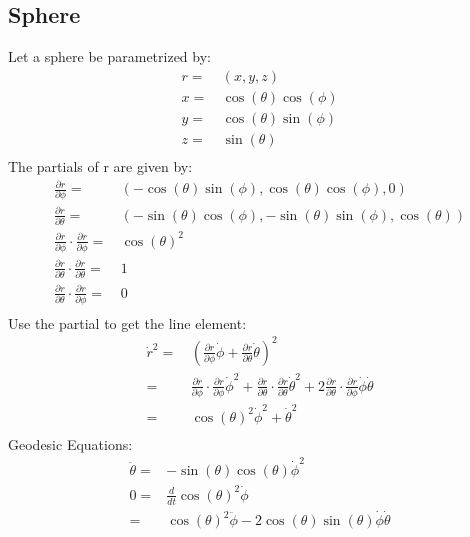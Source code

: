 \subsection{Sphere}
Let a sphere be parametrized by:
\begin{equation*}
\begin{aligned}
	r =&\,(x,y,z) \\
	x =&\, \cos(\theta)\cos(\phi)\\
	y =&\, \cos(\theta)\sin(\phi)\\
	z =&\, \sin(\theta) \\
\end{aligned}
\end{equation*}
The partials of r are given by:
\begin{equation*}
\begin{aligned}
	\frac{\partial r}{\partial \phi} =&\,(-\cos(\theta)\sin(\phi),\cos(\theta)\cos(\phi),0)\\
	\frac{\partial r}{\partial \theta} =&\, (-\sin(\theta)\cos(\phi),-\sin(\theta)\sin(\phi),\cos(\theta)) \\
	\frac{\partial r}{\partial \phi}\cdot\frac{\partial r}{\partial \phi} =&\, \cos(\theta)^2 \\
	\frac{\partial r}{\partial \theta}\cdot\frac{\partial r}{\partial \theta} =&\, 1 \\
	\frac{\partial r}{\partial \theta}\cdot\frac{\partial r}{\partial \phi} =&\, 0 \\
\end{aligned}
\end{equation*}
Use the partial to get the line element:
\begin{equation*}
\begin{aligned}
	\dot{r}^2 =&\, \left(\frac{\partial r}{\partial \phi}\dot{\phi} + \frac{\partial r}{\partial \theta}\dot{\theta}\right)^2 \\
	=&\, \frac{\partial r}{\partial \phi}\cdot\frac{\partial r}{\partial \phi}\dot{\phi}^2+ \frac{\partial r}{\partial \theta}\cdot\frac{\partial r}{\partial \theta}\dot{\theta}^2+2\frac{\partial r}{\partial \theta}\cdot\frac{\partial r}{\partial \phi} \dot{\phi}\dot{\theta} \\
	=&\, \cos(\theta)^2\dot{\phi}^2+ \dot{\theta}^2\\
\end{aligned}
\end{equation*}
Geodesic Equations:
\begin{equation*}
\begin{aligned}
	\ddot{\theta} =& -\sin(\theta)\cos(\theta)\dot{\phi}^2\\
	0 =& \frac{d}{dt}\cos(\theta)^2\dot{\phi} \\
	=& \cos(\theta)^2\ddot{\phi}-2\cos(\theta)\sin(\theta)\dot{\phi}\dot{\theta} \\
\end{aligned}
\end{equation*}
